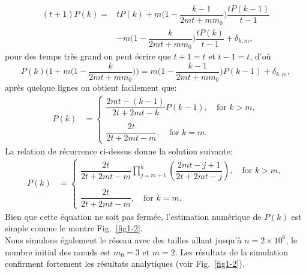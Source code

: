   \begin{equation}
  \begin{aligned}
  (t+1)P(k)= &tP(k)+m\big(1-\dfrac{k-1}{2mt+mm_0}\big)\dfrac{tP(k-1)}{t-1}\\
  &-m\big(1-\dfrac{k}{2mt+mm_0}\big)\dfrac{tP(k)}{t-1} +\delta_{k,m},
  \end{aligned}
  \end{equation}
pour des temps très grand on peut écrire que $t+1=t$ et $t-1=t$, d'où
 \begin{equation}
 P(k)\big(1+m\big(1-\dfrac{k}{2mt+mm_0}\big)\big)=m\big(1-\dfrac{k-1}{2mt+mm_0}\big)P(k-1) +\delta_{k,m},
 \end{equation}
 après quelque lignes on obtient facilement que:
\begin{align}
P(k)&= 
\begin{cases}
\dfrac{2mt - (k-1)}{2t + 2mt - k}P(k-1), \quad \textrm{for }  k>m,\\
\\
\dfrac{2t}{2t + 2mt - m}, \quad\textrm{for }  k=m.
\end{cases}
\end{align}
La relation de récurrence ci-dessus donne la solution suivante:
\begin{align}
P(k)&= 
\begin{cases}
\dfrac{2t}{2t + 2mt - m}\prod^k_{j=m+1}\left( \dfrac{2mt -j + 1}{2t + 2mt - j}\right), \quad \textrm{for }  k>m,\\
\\
\dfrac{2t}{2t + 2mt - m}, \quad\textrm{for }  k=m.
\end{cases}
\label{eq4-2}
\end{align}
Bien que cette équation ne soit pas fermée, l'estimation numérique de $ P (k) $ est simple comme le montre Fig.~\ref{fig1-2}. \\
Nous simulons également le réseau avec des tailles allant jusqu'à $n=2\times10^6$, le nombre initial des nœuds est $m_0=3$ et $m=2$. 
Les résultats de la simulation confirment fortement les résultats analytiques (voir Fig.~\ref{fig1-2}). 

